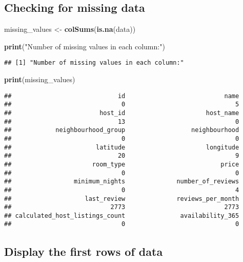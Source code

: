 \documentclass[
]{article}
\newenvironment{Shaded}{\begin{snugshade}}{\end{snugshade}}
\newcommand{\FunctionTok}[1]{\textcolor[rgb]{0.13,0.29,0.53}{\textbf{#1}}}
\newcommand{\NormalTok}[1]{#1}
\newcommand{\OtherTok}[1]{\textcolor[rgb]{0.56,0.35,0.01}{#1}}
\newcommand{\StringTok}[1]{\textcolor[rgb]{0.31,0.60,0.02}{#1}}
\begin{document}
\hypertarget{checking-for-missing-data}{%
\subsection{Checking for missing data}\label{checking-for-missing-data}}

\begin{Shaded}
\begin{Highlighting}[]
\NormalTok{missing\_values }\OtherTok{\textless{}{-}} \FunctionTok{colSums}\NormalTok{(}\FunctionTok{is.na}\NormalTok{(data))}

\FunctionTok{print}\NormalTok{(}\StringTok{"Number of missing values in each column:"}\NormalTok{)}
\end{Highlighting}
\end{Shaded}

\begin{verbatim}
## [1] "Number of missing values in each column:"
\end{verbatim}

\begin{Shaded}
\begin{Highlighting}[]
\FunctionTok{print}\NormalTok{(missing\_values)}
\end{Highlighting}
\end{Shaded}

\begin{verbatim}
##                             id                           name 
##                              0                              5 
##                        host_id                      host_name 
##                             13                              0 
##            neighbourhood_group                  neighbourhood 
##                              0                              0 
##                       latitude                      longitude 
##                             20                              9 
##                      room_type                          price 
##                              0                              0 
##                 minimum_nights              number_of_reviews 
##                              0                              4 
##                    last_review              reviews_per_month 
##                           2773                           2773 
## calculated_host_listings_count               availability_365 
##                              0                              0
\end{verbatim}

\hypertarget{display-the-first-rows-of-data}{%
\subsection{Display the first rows of
data}\label{display-the-first-rows-of-data}}
\end{document}
